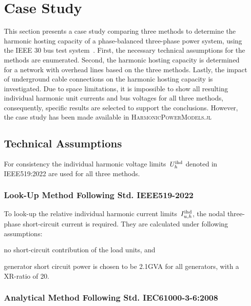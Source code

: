\section{Case Study}
\label{sec:case_study}

This section presents a case study comparing three methods to determine the harmonic hosting capacity of a phase-balanced three-phase power system, using the IEEE 30 bus test system~\cite{shahidehpour_appendix_2003}. First, the necessary technical assumptions for the methods are enumerated. Second, the harmonic hosting capacity is determined for a network with overhead lines based on the three methods. Lastly, the impact of underground cable connections on the harmonic hosting capacity is investigated. Due to space limitations, it is impossible to show all resulting individual harmonic unit currents and bus voltages for all three methods, consequently, specific results are selected to support the conclusions. However, the case study has been made available in \textsc{HarmonicPowerModels.jl}

\subsection{Technical Assumptions}
\label{sec:technical_assumptions}

For consistency the individual harmonic voltage limits~$U^{\text{ihd}}_{h}$ denoted in IEEE519:2022 are used for all three methods. 
\subsubsection{Look-Up Method Following Std. IEEE519-2022}
To look-up the relative individual harmonic current limits~$I^{\text{ihd}}_{u,h}$, the nodal three-phase short-circuit current is required. They are calculated under following assumptions:
\begin{enumerate*}
    \item [a)] no short-circuit contribution of the load units, and
    \item [b)] generator short circuit power is chosen to be 2.1GVA for all generators, with a XR-ratio of 20.
\end{enumerate*}

\subsubsection{Analytical Method Following Std. IEC61000-3-6:2008}

